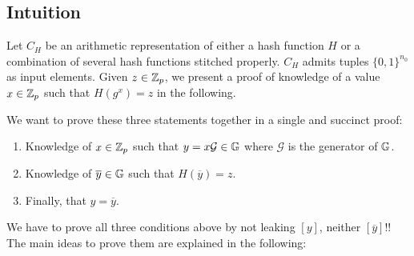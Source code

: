 \subsection{Intuition}

Let $C_H$ be an arithmetic representation of either a hash function $H$ or a combination of several hash functions stitched properly. $C_H$ admits tuples $\{0,1\}^{n_0}$ as input elements. 
Given $z \in \mathbb{Z}_p$, we present a proof of knowledge of a value $x\in \mathbb{Z}_p$ such that $H(g^x)=z$ in the following.

We want to prove these three statements together in a single and succinct proof:
\begin{enumerate}
	\item Knowledge of $x \in \mathbb{Z}_p$ such that $y=x \mathcal{G}\in \mathbb{G}$ where $\mathcal{G}$ is the generator of $\mathbb{G}$. 
	\item Knowledge of $\overline{y} \in \mathbb{G}$ such that $H(\overline{y})=z$. 
	\item Finally, that $y=\overline{y}$.
\end{enumerate}
We have to prove all three conditions above by not leaking $[y]$, neither $[\overline{y}]$!! The main ideas to prove them are explained in the following:
